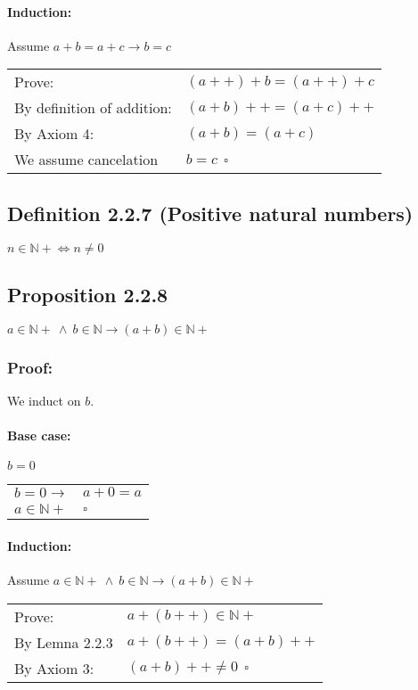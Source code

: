 \documentclass[letterpaper]{article}
\begin{document}
\paragraph{Induction:} Assume $a + b = a + c \to b = c$
\begin{center}
	\begin{tabular}{l l}
		Prove:                     & $(a++) + b = (a++) + c$ \\
		By definition of addition: & $(a + b)++ = (a + c)++$ \\
		By Axiom 4:                & $(a + b) = (a + c)$     \\
		We assume cancelation      & $b = c ~~ \square$      \\
	\end{tabular}
\end{center}

\subsection*{Definition 2.2.7 (Positive natural numbers)}
$n \in \mathbb{N+} \iff n \neq 0$

\subsection*{Proposition 2.2.8}
$ a \in \mathbb{N+} ~\land~ b \in \mathbb{N} \to (a + b) \in \mathbb{N+}$

\subsubsection*{Proof:}
We induct on $b$.

\paragraph{Base case:} $b = 0$
\begin{center}
  \begin{tabular}{l l}
    $b = 0 \to$         & $a + 0 = a$ \\
    $a \in \mathbb{N+}$ & $\square$\\
  \end{tabular}
\end{center}

\paragraph{Induction:} Assume $ a \in \mathbb{N+} ~\land~ b \in \mathbb{N} \to (a + b) \in \mathbb{N+}$
\begin{center}
  \begin{tabular}{l l}
		Prove:              & $a + (b++) \in \mathbb{N+}$ \\
		By Lemna 2.2.3      & $a + (b++) = (a + b)++$    \\
		By Axiom 3:         & $(a + b)++ \neq 0 ~~\square$
  \end{tabular}
\end{center}
\end{document}
